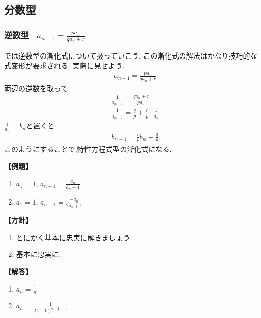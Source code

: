 
\subsection{分数型}
  \subsubsection{逆数型  \, $\displaystyle a_{n+1}=\frac{pa_n}{qa_n+r}$}
    では逆数型の漸化式について扱っていこう.
    この漸化式の解法はかなり技巧的な式変形が要求される.
    実際に見せよう.
    \begin{align*}
      &a_{n+1}=\frac{pa_n}{qa_n+r}
    \end{align*}
      両辺の逆数を取って
    \begin{align*}
      &\frac{1}{a_{n+1}}=\frac{qa_n+r}{pa_n}\\
      &\frac{1}{a_{n+1}}=\frac{q}{p}+\frac{r}{p}\cdot\frac{1}{a_n}
    \end{align*}
    $\displaystyle \frac{1}{a_n}=b_n$と置くと
    \begin{align*}
      &b_{n+1}=\frac{r}{p}b_n+\frac{q}{p}
    \end{align*}
    このようにすることで,特性方程式型の漸化式になる.

    \noindent \textbf{【例題】}
    \begin{enumerate}[label=(\arabic*),parsep=3pt]
      \item $\displaystyle a_1=1,\, a_{n+1}=\frac{a_n}{a_n+1}$
      \item $\displaystyle a_1=1,\, a_{n+1}=\frac{-a_n}{2a_n+1}$
    \end{enumerate}

    \noindent\textbf{【方針】}
    \begin{enumerate}[label=(\arabic*),parsep=3pt]
      \item とにかく基本に忠実に解きましょう.
      \item 基本に忠実に.
    \end{enumerate}

    \noindent\textbf{【解答】}
    \begin{enumerate}[label=(\arabic*),parsep=3pt]
      \item $\displaystyle a_n=\frac{1}{n}$
      \item $\displaystyle a_n=\frac{1}{2(-1)^{n-1}-1}$
    \end{enumerate}


